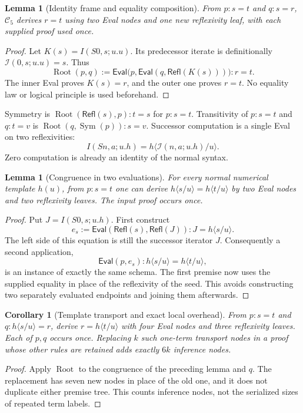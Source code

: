 \documentclass[11pt]{article}
\newtheorem{lemma}[theorem]{Lemma}
\newtheorem{corollary}[theorem]{Corollary}
\theoremstyle{definition}
\newcommand{\C}{\mathcal C_5}
\newcommand{\si}{\mathcal I}
\newcommand{\UE}{\mathsf{Eval}}
\newcommand{\RF}{\mathsf{Refl}}
\begin{document}
\begin{lemma}[Identity frame and equality composition]\label{lem:root}
From $p:s=t$ and $q:s=r$, $\C$ derives $r=t$ using two Eval nodes
and one new reflexivity leaf, with each supplied proof used once.
\end{lemma}
\begin{proof}
Let $K(s)=I(S0,s;u.u)$. Its predecessor iterate is definitionally
$\si(0,s;u.u)=s$. Thus
\[
\operatorname{Root}(p,q):=
\UE\bigl(p,\UE(q,\RF(K(s)))\bigr):r=t.
\]
The inner Eval proves $K(s)=r$, and the outer one proves $r=t$.
No equality law or logical principle is used beforehand.
\end{proof}

Symmetry is $\operatorname{Root}(\RF(s),p):t=s$ for $p:s=t$.
Transitivity of $p:s=t$ and $q:t=v$ is
$\operatorname{Root}(q,\operatorname{Sym}(p)):s=v$.
Successor computation is a single Eval on two reflexivities:
\[
 I(Sn,a;u.h)=h\langle\si(n,a;u.h)/u\rangle.
\]
Zero computation is already an identity of the normal syntax.

\begin{lemma}[Congruence in two evaluations]\label{lem:short-congruence}
For every normal numerical template $h(u)$, from $p:s=t$ one can
derive $h\langle s/u\rangle=h\langle t/u\rangle$ by two Eval nodes
and two reflexivity leaves. The input proof occurs once.
\end{lemma}
\begin{proof}
Put $J=I(S0,s;u.h)$. First construct
\[
 e_s:=\UE(\RF(s),\RF(J)):J=h\langle s/u\rangle.
\]
The left side of this equation is still the successor iterator $J$.
Consequently a second application,
\[
          \UE(p,e_s):h\langle s/u\rangle=h\langle t/u\rangle,
\]
is an instance of exactly the same schema. The first premise now uses
the supplied equality in place of the reflexivity of the seed. This
avoids constructing two separately evaluated endpoints and joining them
afterwards.
\end{proof}

\begin{corollary}[Template transport and exact local overhead]
\label{cor:transport}
From $p:s=t$ and $q:h\langle s/u\rangle=r$, derive
$r=h\langle t/u\rangle$ with four Eval nodes and three reflexivity
leaves. Each of $p,q$ occurs once. Replacing $k$ such one-term transport
nodes in a proof whose other rules are retained adds exactly $6k$
inference nodes.
\end{corollary}
\begin{proof}
Apply $\operatorname{Root}$ to the congruence of the preceding lemma
and $q$. The replacement has seven new nodes in place of the old one,
and it does not duplicate either premise tree. This counts inference
nodes, not the serialized sizes of repeated term labels.
\end{proof}
\end{document}
